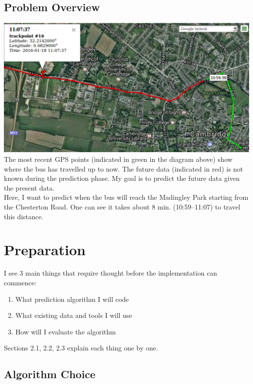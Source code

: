 \documentclass[12pt,a4paper,oneside,openright]{report}
\begin{document}
\section{Problem Overview}

\includegraphics[width=\textwidth]{figs/problem_overview.png} \\

The most recent GPS points (indicated in green in the diagram above) show
where the bus has travelled up to now. The future data (indicated in red)
is not known during the prediction phase. My goal is to predict the future
data given the present data. \\

Here, I want to predict when the bus will reach the Madingley Park starting from the
Chesterton Road. One can see it takes about 8 min. (10:59--11:07) to travel this distance.

\chapter{Preparation}

I see 3 main things that require thought before the implementation can commence:

\begin{enumerate}
\item What prediction algorithm I will code
\item What existing data and tools I will use
\item How will I evaluate the algorithm
\end{enumerate}

Sections 2.1, 2.2, 2.3 explain each thing one by one.

\section{Algorithm Choice}
\end{document}
